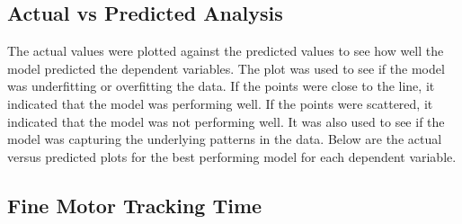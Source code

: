 \subsection{Actual vs Predicted Analysis}
The actual values were plotted against the predicted values to see how well the model predicted the
dependent variables. The plot was used to see if the model was underfitting or overfitting the data. If the points were close to the line, it indicated that the model was performing well.
If the points were scattered, it indicated that the model was not performing well. It was also used to see if the model was capturing the underlying patterns in the data. Below are the 
actual versus predicted plots for the best performing model for each dependent variable.

\subsection*{Fine Motor Tracking Time}

